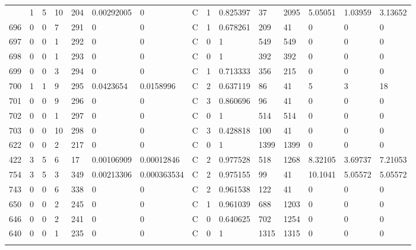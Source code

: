 \begin{latin}
\begin{longtable}{lllllllllllllll}
\begin{comment}
	609 & 1  & 5   & 10 & 204 & 0.00292005     & 0              & C & 1  & 0.825397 & 37   & 2095 & 5.05051 & 1.03959 & 3.13652 \\
	696 & 0  & 0   & 7  & 291 & 0              & 0              & C & 1  & 0.678261 & 209  & 41   & 0       & 0       & 0       \\
	697 & 0  & 0   & 1  & 292 & 0              & 0              & C & 0  & 1        & 549  & 549  & 0       & 0       & 0       \\
	698 & 0  & 0   & 1  & 293 & 0              & 0              & C & 0  & 1        & 392  & 392  & 0       & 0       & 0       \\
	699 & 0  & 0   & 3  & 294 & 0              & 0              & C & 1  & 0.713333 & 356  & 215  & 0       & 0       & 0       \\
	700 & 1  & 1   & 9  & 295 & 0.0423654      & 0.0158996      & C & 2  & 0.637119 & 86   & 41   & 5       & 3       & 18      \\
	701 & 0  & 0   & 9  & 296 & 0              & 0              & C & 3  & 0.860696 & 96   & 41   & 0       & 0       & 0       \\
	702 & 0  & 0   & 1  & 297 & 0              & 0              & C & 0  & 1        & 514  & 514  & 0       & 0       & 0       \\
	703 & 0  & 0   & 10 & 298 & 0              & 0              & C & 3  & 0.428818 & 100  & 41   & 0       & 0       & 0       \\
	622 & 0  & 0   & 2  & 217 & 0              & 0              & C & 0  & 1        & 1399 & 1399 & 0       & 0       & 0       \\
	422 & 3  & 5   & 6  & 17  & 0.00106909     & 0.00012846     & C & 2  & 0.977528 & 518  & 1268 & 8.32105 & 3.69737 & 7.21053 \\
	754 & 3  & 5   & 3  & 349 & 0.00213306     & 0.000363534    & C & 2  & 0.975155 & 99   & 41   & 10.1041 & 5.05572 & 5.05572 \\
	743 & 0  & 0   & 6  & 338 & 0              & 0              & C & 2  & 0.961538 & 122  & 41   & 0       & 0       & 0       \\
	650 & 0  & 0   & 2  & 245 & 0              & 0              & C & 1  & 0.961039 & 688  & 1203 & 0       & 0       & 0       \\
	646 & 0  & 0   & 2  & 241 & 0              & 0              & C & 0  & 0.640625 & 702  & 1254 & 0       & 0       & 0       \\
	640 & 0  & 0   & 1  & 235 & 0              & 0              & C & 0  & 1        & 1315 & 1315 & 0       & 0       & 0       \\

\end{comment}
\end{longtable}
\end{latin}
